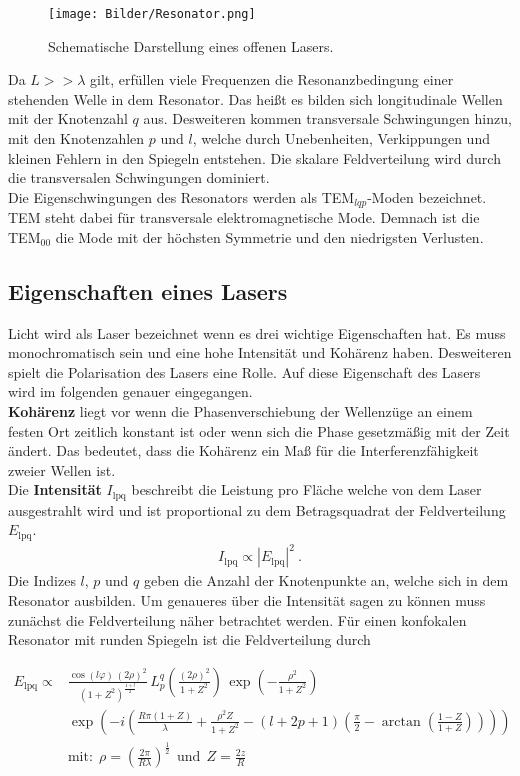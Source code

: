 \begin{figure}[H]
	\texttt{[image: Bilder/Resonator.png]}
	\caption{Schematische Darstellung eines offenen Lasers. \cite{V61}}
	\label{fig:Laser}
\end{figure}

Da $L >> \lambda$ gilt, erfüllen viele Frequenzen die Resonanzbedingung einer stehenden Welle in dem Resonator. Das heißt es bilden sich longitudinale Wellen mit der Knotenzahl $q$ aus. Desweiteren kommen transversale Schwingungen hinzu, mit den Knotenzahlen $p$ und $l$, welche durch Unebenheiten, Verkippungen und kleinen Fehlern in den Spiegeln entstehen. Die skalare Feldverteilung wird durch die transversalen Schwingungen dominiert. \\
Die Eigenschwingungen des Resonators werden als TEM$_{lqp}$-Moden bezeichnet. TEM steht dabei für transversale elektromagnetische Mode. Demnach ist die TEM$_{00}$ die Mode mit der höchsten Symmetrie und den niedrigsten Verlusten.

\subsection{Eigenschaften eines Lasers}
Licht wird als Laser bezeichnet wenn es drei wichtige Eigenschaften hat. Es muss monochromatisch sein und eine hohe Intensität und Kohärenz haben. Desweiteren spielt die Polarisation des Lasers eine Rolle. Auf diese Eigenschaft des Lasers wird im folgenden genauer eingegangen. \\
\textbf{Kohärenz} liegt vor wenn die Phasenverschiebung der Wellenzüge an einem festen Ort zeitlich konstant ist oder wenn sich die Phase gesetzmäßig mit der Zeit ändert.
Das bedeutet, dass die Kohärenz ein Maß für die Interferenzfähigkeit zweier Wellen ist. \\
Die \textbf{Intensität} $I_\text{lpq}$ beschreibt die Leistung pro Fläche welche von dem Laser ausgestrahlt wird und ist proportional zu dem Betragsquadrat der Feldverteilung $E_\text{lpq}$.
\begin{align*}
	I_\text{lpq} \propto |E_\text{lpq}|^2 \ .
\end{align*}
Die Indizes $l$, $p$ und $q$ geben die Anzahl der Knotenpunkte an, welche sich in dem Resonator ausbilden. Um genaueres über die Intensität sagen zu können muss zunächst die Feldverteilung näher betrachtet werden. Für einen konfokalen Resonator mit runden Spiegeln ist die Feldverteilung durch

\begin{align*}
	E_\text{lpq} \propto &\frac{\cos(l\varphi)\,(2\rho)^2}{(1+Z^2)^\frac{1+l}{2}}\, L_p^q\left(\frac{(2\rho)^2}{1+Z^2}\right)\,\exp \left(-\frac{\rho^2}{1+Z^2} \right) \\
	&\exp \left(-i\left(\frac{R\pi(1+Z)}{\lambda}+ \frac{\rho^2Z}{1+Z^2}- (l+2p+1)\left(\frac{\pi}{2}-\arctan \left(\frac{1-Z}{1+Z} \right) \right)\right)\right) \\
	&\text{mit:}\ \ \rho = \left(\frac{2\pi}{R\lambda} \right)^\frac{1}{2} \ \ \text{und} \ \ Z = \frac{2z}{R}
\end{align*}

